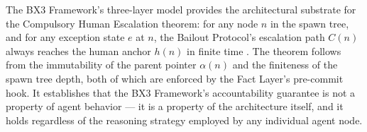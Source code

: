 The BX3 Framework's three-layer model provides the architectural substrate for the Compulsory Human Escalation theorem: for any node $n$ in the spawn tree, and for any exception state $e$ at $n$, the Bailout Protocol's escalation path $C(n)$ always reaches the human anchor $h(n)$ in finite time \cite{bx3framework2026}. The theorem follows from the immutability of the parent pointer $\alpha(n)$ and the finiteness of the spawn tree depth, both of which are enforced by the Fact Layer's pre-commit hook. It establishes that the BX3 Framework's accountability guarantee is not a property of agent behavior --- it is a property of the architecture itself, and it holds regardless of the reasoning strategy employed by any individual agent node.
